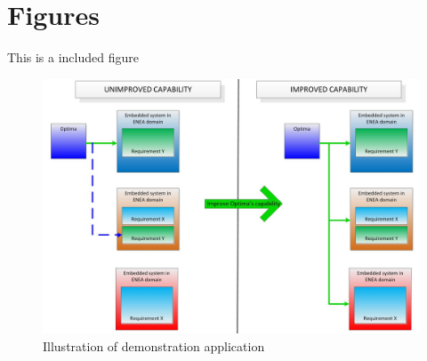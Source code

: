 \chapter{Figures}

This is a included figure \cite{ref1}


\begin{figure}[H]
\includegraphics[scale=0.1]{fig.jpg}
\caption{Illustration of demonstration application}
\label{DemoApplication.JPG}
\end{figure}